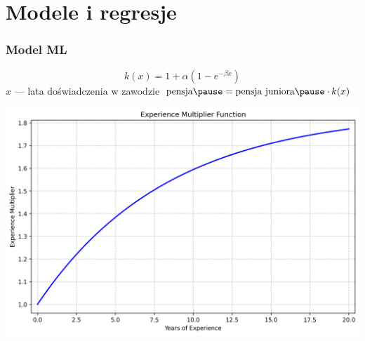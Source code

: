 \documentclass{beamer}
\begin{document}
\section{Modele i regresje}

\begin{frame}
    \frametitle{Model ML}
    \begin{equation}
    k(x) = 1 + \alpha (1 - e^{-\beta x})
    \end{equation}
    \pause
    $x$ --- lata doświadczenia w zawodzie
    \pause
    $\textrm{pensja} \pause = \textrm{pensja juniora} \pause \cdot k(x)$
\end{frame}

\begin{frame}[plain]
    \includegraphics[width=.8\textwidth]{img/experience_multiplier}
\end{frame}
\end{document}

